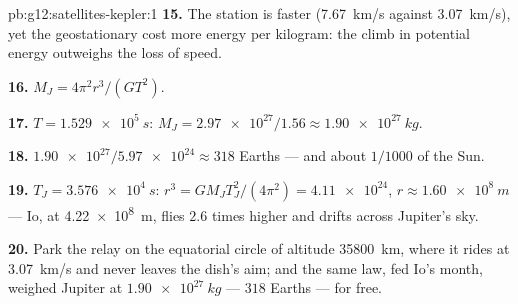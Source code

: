 \begin{solution}{pb:g12:satellites-kepler:1}
\textbf{15.} The station is faster (\qty{7.67}{km/s} against
\qty{3.07}{km/s}), yet the geostationary cost more energy per
kilogram: the climb in potential energy outweighs the loss of speed.

\textbf{16.} $M_J = 4\pi^2 r^3/(G T^2)$.

\textbf{17.} $T = \qty{1.529e5}{s}$: $M_J =
\num{2.97e27}/1.56 \approx \qty{1.90e27}{kg}$.

\textbf{18.} $\num{1.90e27}/\num{5.97e24} \approx 318$ Earths ---
and about $1/1000$ of the Sun.

\textbf{19.} $T_J = \qty{3.576e4}{s}$: $r^3 = GM_J T_J^2/(4\pi^2) =
\num{4.11e24}$, $r \approx \qty{1.60e8}{m}$ --- Io, at
\qty{4.22e8}{m}, flies $2.6$ times higher and drifts across Jupiter's
sky.

\textbf{20.} Park the relay on the equatorial circle of altitude
\qty{35800}{km}, where it rides at \qty{3.07}{km/s} and never leaves
the dish's aim; and the same law, fed Io's month, weighed Jupiter at
$\qty{1.90e27}{kg}$ --- $318$ Earths --- for free.
\end{solution}
